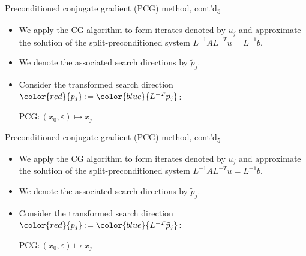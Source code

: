 \documentclass[t,usepdftitle=false]{beamer}
\begin{document}
\begin{frame}{Preconditioned conjugate gradient (PCG) method, cont'd\textsubscript{5}}
\begin{itemize}
\item We apply the CG algorithm to form iterates denoted by $u_j$ and approximate the solution of the split-preconditioned system $L^{-1}AL^{-T}u=L^{-1}b$.
\item[] We denote the associated search directions by $\tilde{p}_j$.
\item[] Consider the transformed search direction ${\color{red}{p_j}}:={\color{blue}{L^{-T}\tilde{p}_j}}$:
\vspace{-.25cm}
\setcounter{algorithm}{3}
\begin{algorithm}[H]
\small
\caption{PCG$:(x_0,\varepsilon)\mapsto x_j$}
\begin{algorithmic}[1]
\ENDFOR
\end{algorithmic}
\end{algorithm}
\end{itemize}
\end{frame}
\setcounter{framenumber}{8}
\begin{frame}{Preconditioned conjugate gradient (PCG) method, cont'd\textsubscript{5}}
\begin{itemize}
\item We apply the CG algorithm to form iterates denoted by $u_j$ and approximate the solution of the split-preconditioned system $L^{-1}AL^{-T}u=L^{-1}b$.
\item[] We denote the associated search directions by $\tilde{p}_j$.
\item[] Consider the transformed search direction ${\color{red}{p_j}}:={\color{blue}{L^{-T}\tilde{p}_j}}$:
\vspace{-.25cm}
\setcounter{algorithm}{3}
\begin{algorithm}[H]
\small
\caption{PCG$:(x_0,\varepsilon)\mapsto x_j$}
\begin{algorithmic}[1]
\ENDFOR
\end{algorithmic}
\end{algorithm}
\end{itemize}
\end{frame}
\end{document}
